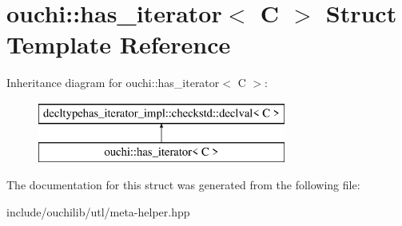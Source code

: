 \hypertarget{structouchi_1_1has__iterator}{}\section{ouchi\+::has\+\_\+iterator$<$ C $>$ Struct Template Reference}
\label{structouchi_1_1has__iterator}
Inheritance diagram for ouchi\+::has\+\_\+iterator$<$ C $>$\+:\begin{figure}[H]
\begin{center}
\leavevmode
\includegraphics[height=2.000000cm]{structouchi_1_1has__iterator}
\end{center}
\end{figure}


The documentation for this struct was generated from the following file\+:\begin{DoxyCompactItemize}
\item 
include/ouchilib/utl/meta-\/helper.\+hpp\end{DoxyCompactItemize}
